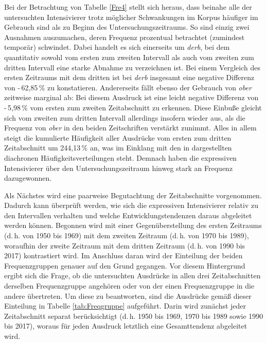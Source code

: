 
\noindent Bei der Betrachtung von Tabelle \ref{Fre4} stellt sich heraus, dass beinahe alle der untersuchten Intensivierer trotz möglicher Schwankungen im Korpus häufiger im Gebrauch sind als zu Beginn des Untersuchungszeitraums. So sind einzig zwei Ausnahmen auszumachen, deren Frequenz prozentual betrachtet (zumindest temporär) schwindet. Dabei handelt es sich einerseits um \textit{derb}, bei dem quantitativ sowohl vom ersten zum zweiten Intervall als auch vom zweiten zum dritten Intervall eine starke Abnahme zu verzeichnen ist. Bei einem Vergleich des ersten Zeitraums mit dem dritten ist bei \textit{derb} insgesamt eine negative Differenz von -\,62,85\,\% zu konstatieren. Andererseits fällt ebenso der Gebrauch von \textit{ober} zeitweise marginal ab: Bei diesem Ausdruck ist eine leicht negative Differenz von -\,5,98\,\% vom ersten zum zweiten Zeitabschnitt zu erkennen. Diese Einbuße gleicht sich vom zweiten zum dritten Intervall allerdings insofern wieder aus, als die Frequenz von \textit{ober} in den beiden Zeitschriften verstärkt zunimmt. Alles in allem steigt die kumulierte Häufigkeit aller Ausdrücke vom ersten zum dritten Zeitabschnitt um 244,13\,\% an, was im Einklang mit den in  dargestellten diachronen Häufigkeitsverteilungen steht. Demnach haben die expressiven Intensivierer über den Untersuchungszeitraum hinweg stark an Frequenz dazugewonnen.

Als Nächstes wird eine paarweise Begutachtung der Zeitabschnitte vorgenommen. Dadurch kann überprüft werden, wie sich die expressiven Intensivierer relativ zu den Intervallen verhalten und welche Entwicklungstendenzen daraus abgeleitet werden können. Begonnen wird mit einer Gegenüberstellung des ersten Zeitraums (d.\,h. von 1950 bis 1969) mit dem zweiten Zeitraum (d.\,h. von 1970 bis 1989), woraufhin der zweite Zeitraum mit dem dritten Zeitraum (d.\,h. von 1990 bis 2017) kontrastiert wird. Im Anschluss daran wird der Einteilung der beiden Frequenzgruppen genauer auf den Grund gegangen. Vor diesem Hintergrund ergibt sich die Frage, ob die untersuchten Ausdrücke in allen drei Zeitabschnitten derselben Frequenzgruppe angehören oder von der einen Frequenzgruppe in die andere übertreten. Um diese zu beantworten, sind die Ausdrücke gemäß dieser Einteilung in Tabelle \ref{tab:Freqgruppe} aufgeführt. Darin wird zunächst jeder Zeitabschnitt separat berücksichtigt (d.\,h. 1950 bis 1969, 1970 bis 1989 sowie 1990 bis 2017), woraus für jeden Ausdruck letztlich eine Gesamttendenz abgeleitet wird.

